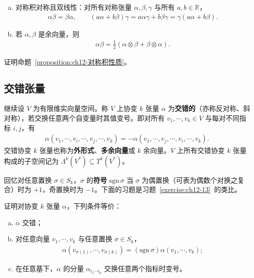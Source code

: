 \documentclass[../../main.tex]{subfiles}
\begin{document}
\begin{proposition}[对称积的性质]\label{proposition:ch12-对称积性质}
\begin{enumerate}[(a)]
\item 对称积对称且双线性：对所有对称张量 $\alpha,\beta,\gamma$ 与所有 $a,b\in\mathbb{R}$，
\begin{align*}
\alpha\beta=\beta\alpha,\qquad (a\alpha+b\beta)\gamma=a\alpha\gamma+b\beta\gamma=\gamma(a\alpha+b\beta).
\end{align*}
\item 若 $\alpha,\beta$ 是余向量，则
\begin{align*}
\alpha\beta=\frac{1}{2}(\alpha\otimes\beta+\beta\otimes\alpha).
\end{align*}
\end{enumerate}
\end{proposition}

\begin{exercise}\label{exercise:ch12-16}
证明命题~\ref{proposition:ch12-对称积性质}。
\end{exercise}

\subsection*{交错张量}

继续设 $V$ 为有限维实向量空间。称 $V$ 上协变 $k$ 张量 $\alpha$ 为\textbf{交错的}（亦称反对称、斜对称），若交换任意两个自变量时其值变号。即对所有 $v_1,\cdots ,v_k\in V$ 与每对不同指标 $i,j$，有
\begin{align*}
\alpha(v_1,\cdots ,v_i,\cdots ,v_j,\cdots ,v_k)=-\alpha(v_1,\cdots ,v_j,\cdots ,v_i,\cdots ,v_k).
\end{align*}
交错协变 $k$ 张量也称为\textbf{外形式}、\textbf{多余向量}或 $k$ 余向量。$V$ 上所有交错协变 $k$ 张量构成的子空间记为 $\Lambda^k(V^*)\subseteq T^k(V^*)$。

回忆对任意置换 $\sigma\in S_k$，$\sigma$ 的\textbf{符号} $\mathrm{sgn}\,\sigma$ 当 $\sigma$ 为偶置换（可表为偶数个对换之复合）时为 $+1$，奇置换时为 $-1$。下面的习题是习题~\ref{exercise:ch12-13}~的类比。

\begin{exercise}\label{exercise:ch12-17}
证明对协变 $k$ 张量 $\alpha$，下列条件等价：
\begin{enumerate}[(a)]
\item $\alpha$ 交错；
\item 对任意向量 $v_1,\cdots ,v_k$ 与任意置换 $\sigma\in S_k$，
\begin{align*}
\alpha(v_{\sigma(1)},\cdots ,v_{\sigma(k)})=(\mathrm{sgn}\,\sigma)\alpha(v_1,\cdots ,v_k);
\end{align*}
\item 在任意基下，$\alpha$ 的分量 $\alpha_{i_1\cdots  i_k}$ 交换任意两个指标时变号。
\end{enumerate}
\end{exercise}
\end{document}
